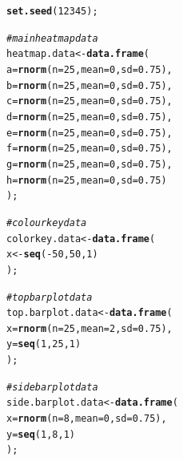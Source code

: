 \documentclass[letterpaper]{article}\usepackage[]{graphicx}\usepackage[]{color}
\makeatletter
\newcommand{\hlnum}[1]{\textcolor[rgb]{0.686,0.059,0.569}{#1}}%
\newcommand{\hlcom}[1]{\textcolor[rgb]{0.678,0.584,0.686}{\textit{#1}}}%
\newcommand{\hlopt}[1]{\textcolor[rgb]{0,0,0}{#1}}%
\newcommand{\hlstd}[1]{\textcolor[rgb]{0.345,0.345,0.345}{#1}}%
\newcommand{\hlkwb}[1]{\textcolor[rgb]{0.69,0.353,0.396}{#1}}%
\newcommand{\hlkwc}[1]{\textcolor[rgb]{0.333,0.667,0.333}{#1}}%
\newcommand{\hlkwd}[1]{\textcolor[rgb]{0.737,0.353,0.396}{\textbf{#1}}}%
\newenvironment{kframe}{%
 \def\at@end@of@kframe{}%
 \ifinner\ifhmode%
  \def\at@end@of@kframe{\end{minipage}}%
  \begin{minipage}{\columnwidth}%
 \fi\fi%
 \def\FrameCommand##1{\hskip\@totalleftmargin \hskip-\fboxsep
 \colorbox{shadecolor}{##1}\hskip-\fboxsep
     \hskip-\linewidth \hskip-\@totalleftmargin \hskip\columnwidth}%
 \MakeFramed {\advance\hsize-\width
   \@totalleftmargin\z@ \linewidth\hsize
   \@setminipage}}%
 {\par\unskip\endMakeFramed%
 \at@end@of@kframe}
\newenvironment{knitrout}{}{} %
\makeatother
\begin{document}
\begin{knitrout}
\color{fgcolor}\begin{kframe}
\begin{alltt}
\hlkwd{set.seed}\hlstd{(}\hlnum{12345}\hlstd{);}

\hlcom{# main heatmap data}
\hlstd{heatmap.data} \hlkwb{<-} \hlkwd{data.frame}\hlstd{(}
    \hlkwc{a} \hlstd{=} \hlkwd{rnorm}\hlstd{(}\hlkwc{n} \hlstd{=} \hlnum{25}\hlstd{,} \hlkwc{mean} \hlstd{=} \hlnum{0}\hlstd{,} \hlkwc{sd} \hlstd{=} \hlnum{0.75}\hlstd{),}
    \hlkwc{b} \hlstd{=} \hlkwd{rnorm}\hlstd{(}\hlkwc{n} \hlstd{=} \hlnum{25}\hlstd{,} \hlkwc{mean} \hlstd{=} \hlnum{0}\hlstd{,} \hlkwc{sd} \hlstd{=} \hlnum{0.75}\hlstd{),}
    \hlkwc{c} \hlstd{=} \hlkwd{rnorm}\hlstd{(}\hlkwc{n} \hlstd{=} \hlnum{25}\hlstd{,} \hlkwc{mean} \hlstd{=} \hlnum{0}\hlstd{,} \hlkwc{sd} \hlstd{=} \hlnum{0.75}\hlstd{),}
    \hlkwc{d} \hlstd{=} \hlkwd{rnorm}\hlstd{(}\hlkwc{n} \hlstd{=} \hlnum{25}\hlstd{,} \hlkwc{mean} \hlstd{=} \hlnum{0}\hlstd{,} \hlkwc{sd} \hlstd{=} \hlnum{0.75}\hlstd{),}
    \hlkwc{e} \hlstd{=} \hlkwd{rnorm}\hlstd{(}\hlkwc{n} \hlstd{=} \hlnum{25}\hlstd{,} \hlkwc{mean} \hlstd{=} \hlnum{0}\hlstd{,} \hlkwc{sd} \hlstd{=} \hlnum{0.75}\hlstd{),}
    \hlkwc{f} \hlstd{=} \hlkwd{rnorm}\hlstd{(}\hlkwc{n} \hlstd{=} \hlnum{25}\hlstd{,} \hlkwc{mean} \hlstd{=} \hlnum{0}\hlstd{,} \hlkwc{sd} \hlstd{=} \hlnum{0.75}\hlstd{),}
    \hlkwc{g} \hlstd{=} \hlkwd{rnorm}\hlstd{(}\hlkwc{n} \hlstd{=} \hlnum{25}\hlstd{,} \hlkwc{mean} \hlstd{=} \hlnum{0}\hlstd{,} \hlkwc{sd} \hlstd{=} \hlnum{0.75}\hlstd{),}
    \hlkwc{h} \hlstd{=} \hlkwd{rnorm}\hlstd{(}\hlkwc{n} \hlstd{=} \hlnum{25}\hlstd{,} \hlkwc{mean} \hlstd{=} \hlnum{0}\hlstd{,} \hlkwc{sd} \hlstd{=} \hlnum{0.75}\hlstd{)}
    \hlstd{);}

\hlcom{# colourkey data}
\hlstd{colorkey.data} \hlkwb{<-} \hlkwd{data.frame}\hlstd{(}
    \hlstd{x} \hlkwb{<-} \hlkwd{seq}\hlstd{(}\hlopt{-}\hlnum{50}\hlstd{,}\hlnum{50}\hlstd{,}\hlnum{1}\hlstd{)}
    \hlstd{);}

\hlcom{# top barplot data}
\hlstd{top.barplot.data} \hlkwb{<-} \hlkwd{data.frame}\hlstd{(}
    \hlkwc{x} \hlstd{=} \hlkwd{rnorm}\hlstd{(}\hlkwc{n} \hlstd{=} \hlnum{25}\hlstd{,} \hlkwc{mean} \hlstd{=} \hlnum{2}\hlstd{,} \hlkwc{sd} \hlstd{=} \hlnum{0.75}\hlstd{),}
    \hlkwc{y} \hlstd{=} \hlkwd{seq}\hlstd{(}\hlnum{1}\hlstd{,}\hlnum{25}\hlstd{,}\hlnum{1}\hlstd{)}
    \hlstd{);}

 \hlcom{# side barplot data}
\hlstd{side.barplot.data} \hlkwb{<-} \hlkwd{data.frame}\hlstd{(}
    \hlkwc{x} \hlstd{=} \hlkwd{rnorm}\hlstd{(}\hlkwc{n} \hlstd{=} \hlnum{8}\hlstd{,} \hlkwc{mean} \hlstd{=} \hlnum{0}\hlstd{,} \hlkwc{sd} \hlstd{=} \hlnum{0.75}\hlstd{),}
    \hlkwc{y} \hlstd{=} \hlkwd{seq}\hlstd{(}\hlnum{1}\hlstd{,}\hlnum{8}\hlstd{,}\hlnum{1}\hlstd{)}
    \hlstd{);}
\end{alltt}
\end{kframe}
\end{knitrout}
\end{document}
